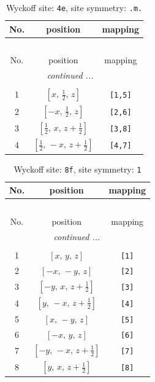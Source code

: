 \documentclass[fleqn,8pt]{jsarticle}
\begin{document}
\begin{longtable}{ccc}
\caption{Wyckoff site: {\tt 4e}, site symmetry: {\tt .m.}}
 \\
 \hline \hline
No. & position & mapping \\ \hline \endfirsthead

\multicolumn{2}{l}{\tablename\ \thetable{}} \\
 \hline \hline
No. & position & mapping \\ \hline \endhead

 \hline \hline
\multicolumn{2}{r}{\footnotesize\it continued ...} \\ \endfoot

 \hline \hline
\multicolumn{2}{r}{} \\ \endlastfoot

1 & $\left[ x,\, \frac{1}{2},\, z \right]$ & {\tt [1,5]} \\ \hline
2 & $\left[ - x,\, \frac{1}{2},\, z \right]$ & {\tt [2,6]} \\ \hline
3 & $\left[ \frac{1}{2},\, x,\, z + \frac{1}{2} \right]$ & {\tt [3,8]} \\ \hline
4 & $\left[ \frac{1}{2},\, - x,\, z + \frac{1}{2} \right]$ & {\tt [4,7]} \\
\end{longtable}
\renewcommand{\arraystretch}{1.2}
\begin{longtable}{ccc}
\caption{Wyckoff site: {\tt 8f}, site symmetry: {\tt 1}}
 \\
 \hline \hline
No. & position & mapping \\ \hline \endfirsthead

\multicolumn{2}{l}{\tablename\ \thetable{}} \\
 \hline \hline
No. & position & mapping \\ \hline \endhead

 \hline \hline
\multicolumn{2}{r}{\footnotesize\it continued ...} \\ \endfoot

 \hline \hline
\multicolumn{2}{r}{} \\ \endlastfoot

1 & $\left[ x,\, y,\, z \right]$ & {\tt [1]} \\ \hline
2 & $\left[ - x,\, - y,\, z \right]$ & {\tt [2]} \\ \hline
3 & $\left[ - y,\, x,\, z + \frac{1}{2} \right]$ & {\tt [3]} \\ \hline
4 & $\left[ y,\, - x,\, z + \frac{1}{2} \right]$ & {\tt [4]} \\ \hline
5 & $\left[ x,\, - y,\, z \right]$ & {\tt [5]} \\ \hline
6 & $\left[ - x,\, y,\, z \right]$ & {\tt [6]} \\ \hline
7 & $\left[ - y,\, - x,\, z + \frac{1}{2} \right]$ & {\tt [7]} \\ \hline
8 & $\left[ y,\, x,\, z + \frac{1}{2} \right]$ & {\tt [8]} \\
\end{longtable}
\end{document}
